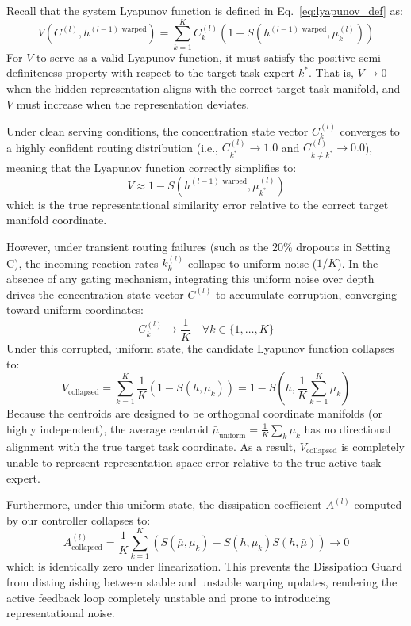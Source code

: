 Recall that the system Lyapunov function is defined in Eq.~\eqref{eq:lyapunov_def} as:
\begin{equation}
V(C^{(l)}, h^{(l-1) \text{ warped}}) = \sum_{k=1}^K C_k^{(l)} \left( 1 - S(h^{(l-1) \text{ warped}}, \mu_k^{(l)}) \right)
\end{equation}
For $V$ to serve as a valid Lyapunov function, it must satisfy the positive semi-definiteness property with respect to the target task expert $k^*$. That is, $V \to 0$ when the hidden representation aligns with the correct target task manifold, and $V$ must increase when the representation deviates. 

Under clean serving conditions, the concentration state vector $C_k^{(l)}$ converges to a highly confident routing distribution (i.e., $C_{k^*}^{(l)} \to 1.0$ and $C_{k \ne k^*}^{(l)} \to 0.0$), meaning that the Lyapunov function correctly simplifies to:
\begin{equation}
V \approx 1 - S(h^{(l-1) \text{ warped}}, \mu_{k^*}^{(l)})
\end{equation}
which is the true representational similarity error relative to the correct target manifold coordinate.

However, under transient routing failures (such as the $20\%$ dropouts in Setting C), the incoming reaction rates $k_k^{(l)}$ collapse to uniform noise ($1/K$). In the absence of any gating mechanism, integrating this uniform noise over depth drives the concentration state vector $C^{(l)}$ to accumulate corruption, converging toward uniform coordinates:
\begin{equation}
C_k^{(l)} \to \frac{1}{K} \quad \forall k \in \{1,\dots,K\}
\end{equation}
Under this corrupted, uniform state, the candidate Lyapunov function collapses to:
\begin{equation}
V_{\text{collapsed}} = \sum_{k=1}^K \frac{1}{K} \left( 1 - S(h, \mu_k) \right) = 1 - S\left( h, \frac{1}{K} \sum_{k=1}^K \mu_k \right)
\end{equation}
Because the centroids are designed to be orthogonal coordinate manifolds (or highly independent), the average centroid $\bar{\mu}_{\text{uniform}} = \frac{1}{K} \sum_k \mu_k$ has no directional alignment with the true target task coordinate. As a result, $V_{\text{collapsed}}$ is completely unable to represent representation-space error relative to the true active task expert. 

Furthermore, under this uniform state, the dissipation coefficient $A^{(l)}$ computed by our controller collapses to:
\begin{equation}
A_{\text{collapsed}}^{(l)} = \frac{1}{K} \sum_{k=1}^K \left( S(\bar{\mu}, \mu_k) - S(h, \mu_k) S(h, \bar{\mu}) \right) \to 0
\end{equation}
which is identically zero under linearization. This prevents the Dissipation Guard from distinguishing between stable and unstable warping updates, rendering the active feedback loop completely unstable and prone to introducing representational noise.

